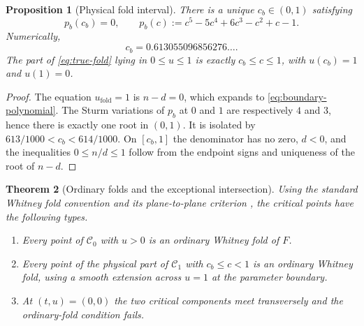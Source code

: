 \documentclass[11pt]{article}
\newtheorem{theorem}{Theorem}[section]
\newtheorem{proposition}[theorem]{Proposition}
\theoremstyle{definition}
\newcommand{\Csym}{\mathcal C_0}
\newcommand{\Crat}{\mathcal C_1}
\begin{document}
\begin{proposition}[Physical fold interval]\label{prop:physical-fold}
There is a unique $c_b\in(0,1)$ satisfying
\begin{equation}\label{eq:boundary-polynomial}
p_b(c_b)=0,\qquad
p_b(c):=c^5-5c^4+6c^3-c^2+c-1.
\end{equation}
Numerically,
\[
c_b=0.613055096856276\ldots.
\]
The part of \eqref{eq:true-fold} lying in $0\leq u\leq1$ is exactly
$c_b\leq c\leq1$, with $u(c_b)=1$ and $u(1)=0$.
\end{proposition}

\begin{proof}
The equation $u_{\mathrm{fold}}=1$ is $n-d=0$, which expands to
\eqref{eq:boundary-polynomial}.  The Sturm variations of $p_b$ at $0$ and
$1$ are respectively $4$ and $3$, hence there is exactly one root in
$(0,1)$.  It is isolated by
$613/1000<c_b<614/1000$.  On $[c_b,1]$ the denominator has no zero,
$d<0$, and the inequalities $0\leq n/d\leq1$ follow from the endpoint
signs and uniqueness of the root of $n-d$.
\end{proof}

\begin{theorem}[Ordinary folds and the exceptional intersection]
\label{thm:fold-types}
Using the standard Whitney fold convention and its plane-to-plane
criterion \cite{whitney1955,golubitsky1973}, the critical points have the
following types.
\begin{enumerate}
\item Every point of $\Csym$ with $u>0$ is an ordinary Whitney fold of $F$.
\item Every point of the physical part of $\Crat$ with $c_b\leq c<1$ is
an ordinary Whitney fold, using a smooth extension across $u=1$ at the
parameter boundary.
\item At $(t,u)=(0,0)$ the two critical components meet transversely and the
ordinary-fold condition fails.
\end{enumerate}
\end{theorem}
\end{document}
